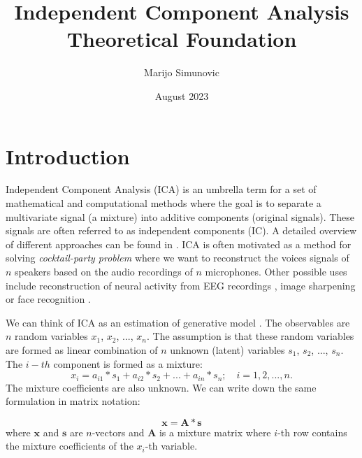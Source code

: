 \documentclass{article}
\title{Independent Component Analysis \\ Theoretical Foundation}
\author{Marijo Simunovic}
\date{August 2023}
\begin{document}
\maketitle

\section{Introduction}

Independent Component Analysis (ICA) is an umbrella term for a set of mathematical and computational methods where the goal is to separate a multivariate signal (a mixture) into additive components (original signals). These signals are often referred to as independent components (IC). A detailed overview of different approaches can be found in \cite{Hyvarinen2001}.
ICA is often motivated as a method for solving \textit{cocktail-party problem} \cite{Brown2001} where we want to reconstruct the voices signals of $n$ speakers based on the audio recordings of $n$ microphones.
Other possible uses include reconstruction of neural activity from EEG recordings \cite{Parker2005}, image sharpening \cite{Kopriva2004} or face recognition \cite{Bartlett2002}.

We can think of ICA as an estimation of generative model \cite{Hyvarinen2000}. The observables are $n$ random variables $x_1$, $x_2$, ..., $x_n$. The assumption is that these random variables are formed as linear combination of $n$ unknown (latent) variables $s_1$, $s_2$, ..., $s_n$. The $i-th$ component is formed as a mixture:
\begin{equation}
x_i = a_{i1} * s_1 + a_{i2} * s_2 + ... + a_{in} * s_n;\quad i=1, 2, ..., n.
\end{equation}
The mixture coefficients are also unknown. We can write down the same formulation in matrix notation:

\begin{equation}
    \textbf{x} = \textbf{A} * \textbf{s}
\end{equation}
where $\textbf{x}$ and $\textbf{s}$ are $n$-vectors and $\textbf{A}$ is a mixture matrix where $i$-th row contains the
mixture coefficients of the $x_i$-th variable.
\end{document}
